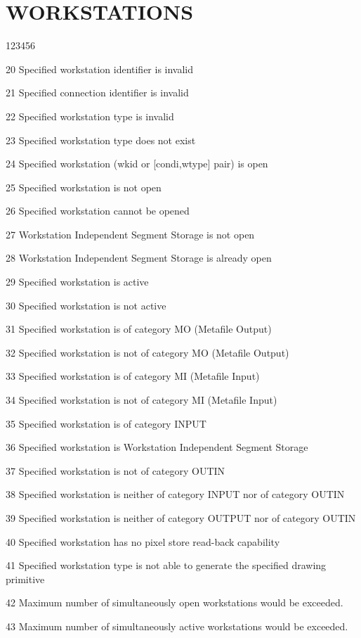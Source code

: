 \section{WORKSTATIONS}
\begin{DLtt}{123456}
\item[20]
Specified workstation identifier is invalid
\item[21]
Specified connection identifier is invalid
\item[22]
Specified workstation type is invalid
\item[23]
Specified workstation type does not exist
\item[24]
Specified workstation (wkid or [condi,wtype] pair) is open
\item[25]
Specified workstation is not open
\item[26]
Specified workstation cannot be opened
\item[27]
Workstation Independent Segment Storage is not open
\item[28]
Workstation Independent Segment Storage is already open
\item[29]
Specified workstation is active
\item[30]
Specified workstation is not active
\item[31]
Specified workstation is of category MO (Metafile Output)
\item[32]
Specified workstation is not of category MO (Metafile Output)
\item[33]
Specified workstation is of category MI (Metafile Input)
\item[34]
Specified workstation is not of category MI (Metafile Input)
\item[35]
Specified workstation is of category INPUT
\item[36]
Specified workstation is Workstation Independent Segment Storage
\item[37]
Specified workstation is not of category OUTIN
\item[38]
Specified workstation is neither of category INPUT nor of category OUTIN
\item[39]
Specified workstation is neither of category OUTPUT nor of category OUTIN
\item[40]
Specified workstation has no pixel store read-back capability
\item[41]
Specified workstation type is not able to generate the specified
drawing primitive
\item[42]
Maximum number of simultaneously open workstations would be exceeded.
\item[43]
Maximum number of simultaneously active workstations would be exceeded.
\end{DLtt}
